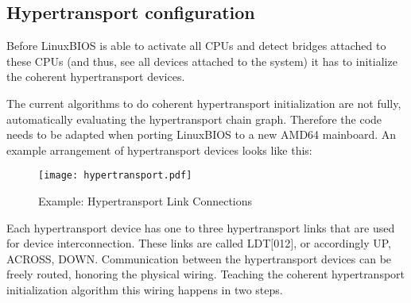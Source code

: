 \documentclass[titlepage,12pt]{article}
\begin{document}
\subsection{Hypertransport configuration}
Before LinuxBIOS is able to activate all CPUs and detect bridges
attached to these CPUs (and thus, see all devices attached to the
system) it has to initialize the coherent hypertransport devices.

The current algorithms to do coherent hypertransport initialization are
not fully, automatically evaluating the hypertransport chain graph.
Therefore the code needs to be adapted when porting LinuxBIOS to a new
AMD64 mainboard. An example arrangement of hypertransport devices
looks like this:

\begin{figure}[htb]
\centering
\texttt{[image: hypertransport.pdf]}
\caption{Example: Hypertransport Link Connections}
\label{fix:hypertransport}
\end{figure}

Each hypertransport device has one to three hypertransport links that
are used for device interconnection. These links are called LDT$[$012$]$, or
accordingly UP, ACROSS, DOWN.  Communication between the hypertransport
devices can be freely routed, honoring the physical wiring. Teaching the
coherent hypertransport initialization algorithm this wiring happens in
two steps.

\newpage
\end{document}
